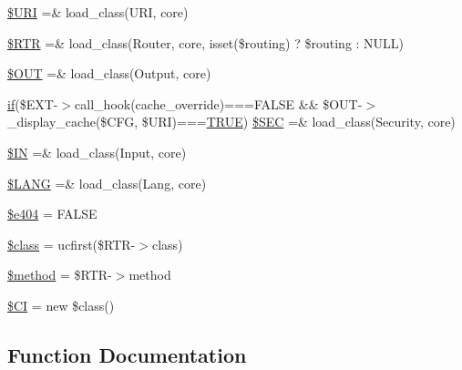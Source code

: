 \begin{DoxyCompactItemize}
\item 
\mbox{\hyperlink{_code_igniter_8php_a630d83d898b39ad4568906284f7f5336}{\$\+U\+RI}} =\& load\+\_\+class(\textquotesingle{}U\+RI\textquotesingle{}, \textquotesingle{}core\textquotesingle{})
\item 
\mbox{\hyperlink{_code_igniter_8php_a4d6c9285c8483e4708a57a4128fc95f3}{\$\+R\+TR}} =\& load\+\_\+class(\textquotesingle{}Router\textquotesingle{}, \textquotesingle{}core\textquotesingle{}, isset(\$routing) ? \$routing \+: N\+U\+LL)
\item 
\mbox{\hyperlink{_code_igniter_8php_ad437402616c81c82c746f09854b23729}{\$\+O\+UT}} =\& load\+\_\+class(\textquotesingle{}Output\textquotesingle{}, \textquotesingle{}core\textquotesingle{})
\item 
\mbox{\hyperlink{_test_test_8php_a107bc088eea0dce8972b45c841f5ff9c}{if}}(\$E\+XT-\/$>$call\+\_\+hook(\textquotesingle{}cache\+\_\+override\textquotesingle{})===F\+A\+L\+SE \&\& \$O\+UT-\/$>$\+\_\+display\+\_\+cache(\$C\+FG, \$U\+RI)===\mbox{\hyperlink{constants_8php_ae04a3efe6aa42044f803ee90c2277846}{T\+R\+UE}}) \mbox{\hyperlink{_code_igniter_8php_a4b7abe119386c359d42b2eddeb8383b8}{\$\+S\+EC}} =\& load\+\_\+class(\textquotesingle{}Security\textquotesingle{}, \textquotesingle{}core\textquotesingle{})
\item 
\mbox{\hyperlink{_code_igniter_8php_a66d076d48aff75a01bb726f5bdd94d46}{\$\+IN}} =\& load\+\_\+class(\textquotesingle{}Input\textquotesingle{}, \textquotesingle{}core\textquotesingle{})
\item 
\mbox{\hyperlink{_code_igniter_8php_afab4eb732acc05cebf41e0afce18681c}{\$\+L\+A\+NG}} =\& load\+\_\+class(\textquotesingle{}Lang\textquotesingle{}, \textquotesingle{}core\textquotesingle{})
\item 
\mbox{\hyperlink{_code_igniter_8php_a20b89fa011927fc498a4a665fa44d061}{\$e404}} = F\+A\+L\+SE
\item 
\mbox{\hyperlink{_code_igniter_8php_a252ba022809910ea710a068fc1bab657}{\$class}} = ucfirst(\$R\+TR-\/$>$class)
\item 
\mbox{\hyperlink{_code_igniter_8php_a12661b2fc0f57f97e30a1620889ce9c6}{\$method}} = \$R\+TR-\/$>$method
\item 
\mbox{\hyperlink{_code_igniter_8php_ae0314d046ddf7fcfaec03222977427d3}{\$\+CI}} = new \$class()
\end{DoxyCompactItemize}


\subsection{Function Documentation}
\mbox{\label{_code_igniter_8php_a185483844bd20a0e80955460d66d2199}} 
